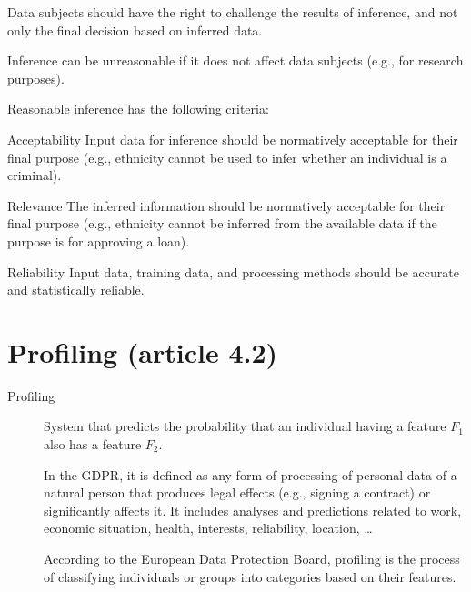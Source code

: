 \begin{description}
        \begin{remark}
            Data subjects should have the right to challenge the results of inference, and not only the final decision based on inferred data.
        \end{remark}

        \begin{remark}
            Inference can be unreasonable if it does not affect data subjects (e.g., for research purposes).
        \end{remark}

        Reasonable inference has the following criteria:
        \begin{descriptionlist}
            \item[Acceptability] 
                Input data for inference should be normatively acceptable for their final purpose (e.g., ethnicity cannot be used to infer whether an individual is a criminal).

            \item[Relevance] 
                The inferred information should be normatively acceptable for their final purpose (e.g., ethnicity cannot be inferred from the available data if the purpose is for approving a loan).

            \item[Reliability] 
                Input data, training data, and processing methods should be accurate and statistically reliable.
        \end{descriptionlist}
\end{description}



\section{Profiling (article 4.2)}

\begin{description}
    \item[Profiling]   
        System that predicts the probability that an individual having a feature $F_1$ also has a feature $F_2$.

        In the GDPR, it is defined as any form of processing of personal data of a natural person that produces legal effects (e.g., signing a contract) or significantly affects it. It includes analyses and predictions related to work, economic situation, health, interests, reliability, location, \dots

        According to the European Data Protection Board, profiling is the process of classifying individuals or groups into categories based on their features.
\end{description}


